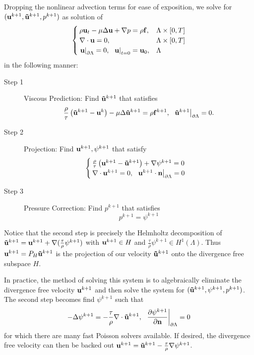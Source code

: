 \documentclass[letterpaper]{erdc}
\begin{document}
Dropping the nonlinear advection terms for ease of exposition, we solve for $(\textbf{u}^{k+1}, \mathbf{\tilde{u}}^{k+1}, p^{k+1})$ as solution of 
\begin{equation}
\begin{cases}
  \rho\textbf{u}_t - \mu\Delta\textbf{u} + \nabla p = \rho\mathbf{f},& \Lambda\times[0,T]\\
  \nabla\cdot \textbf{u} = 0,& \Lambda\times[0,T]\\
  \left.\textbf{u}\right|_{\partial\Lambda} = 0,\hspace{2mm} \left.\textbf{u}\right|_{t=0} = \textbf{u}_0,& \Lambda
\end{cases}
\end{equation}
in the following manner:
\begin{description}
  \item[Step 1] Viscous Prediction:  Find $\mathbf{\tilde{u}}^{k+1}$ that satisfies
  \begin{equation}
    \frac{\rho}{\tau}\left(\mathbf{\tilde{u}}^{k+1} - \textbf{u}^{k} \right) - \mu \Delta \mathbf{\tilde{u}}^{k+1} = \rho\mathbf{f}^{k+1},  \hspace{2mm} \left.\mathbf{\tilde{u}}^{k+1}\right|_{\partial\Lambda} = 0.
  \end{equation}
  
  \item[Step 2] Projection:  Find $\textbf{u}^{k+1}, \psi^{k+1}$ that satisfy
  \begin{equation}
    \begin{cases}
    \frac{\rho}{\tau}\left(\textbf{u}^{k+1} - \mathbf{\tilde{u}}^{k+1} \right) + \nabla \psi^{k+1} = 0 \\
    \nabla\cdot \textbf{u}^{k+1} = 0, \hspace{2mm} \left.\textbf{u}^{k+1}\cdot\textbf{n} \right|_{\partial\Lambda} = 0
    \end{cases}
  \end{equation}
  
  \item[Step 3] Pressure Correction: Find $p^{k+1}$ that satisfies
  \begin{equation}
    p^{k+1} = \psi^{k+1}
  \end{equation} 
\end{description}

Notice that the second step is precisely the Helmholtz decomposition of $\mathbf{\tilde{u}}^{k+1} = \textbf{u}^{k+1} + \nabla(\frac{\tau}{\rho} \psi^{k+1})$ with $\textbf{u}^{k+1}\in H$ and $\frac{\tau}{\rho}\psi^{k+1}\in H^1(\Lambda)$.  Thus $\textbf{u}^{k+1} = P_{H}\mathbf{\tilde{u}}^{k+1}$ is the projection of our velocity $\mathbf{\tilde{u}}^{k+1}$ onto the divergence free subspace $H$.

In practice, the method of solving this system is to algebraically eliminate the divergence free velocity $\textbf{u}^{k+1}$ and then solve the system for $(\mathbf{\tilde{u}}^{k+1},\psi^{k+1}, p^{k+1})$.  The second step becomes find $\psi^{k+1}$ such that
\begin{equation}
  -\Delta\psi^{k+1} = -\frac{\tau}{\rho} \nabla\cdot \mathbf{\tilde{u}}^{k+1}, \hspace{2mm} \left.\frac{\partial \psi^{k+1}}{\partial\textbf{n}}\right|_{\partial\Lambda} = 0
\end{equation}
for which there are many fast Poisson solvers available. If desired, the divergence free velocity can then be backed out $\textbf{u}^{k+1} = \mathbf{\tilde{u}}^{k+1} -\frac{\tau}{\rho} \nabla\psi^{k+1}$.
\end{document}
